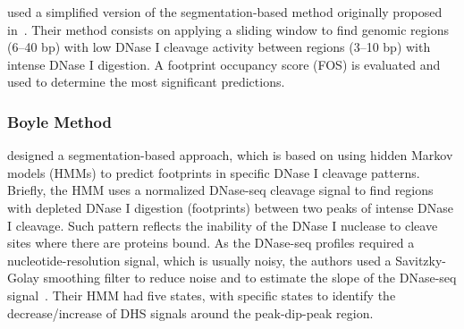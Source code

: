 \documentclass[11pt]{article}
\begin{document}
\cite{neph2012a} used a simplified version of the segmentation-based method originally proposed in~\cite{hesselberth2009}. Their method consists on applying a sliding window to find genomic regions (6--40 bp) with low DNase I cleavage activity between regions (3--10 bp) with intense DNase I digestion. A footprint occupancy score (FOS) is evaluated and used to determine the most significant predictions.

{}

\subsubsection{Boyle Method}
\label{sec:boyle}

\cite{boyle2011} designed a segmentation-based approach, which is based on using hidden Markov models (HMMs) to predict footprints in specific DNase I cleavage patterns. Briefly, the HMM uses a normalized DNase-seq cleavage signal to find regions with depleted DNase I digestion (footprints) between two peaks of intense DNase I cleavage. Such pattern reflects the inability of the DNase I nuclease to cleave sites where there are proteins bound. As the DNase-seq profiles required a nucleotide-resolution signal, which is usually noisy, the authors used a Savitzky-Golay smoothing filter to reduce noise and to estimate the slope of the DNase-seq signal~\citep{madden1978}. Their HMM had five states, with specific states to identify the decrease/increase of DHS signals around the peak-dip-peak region. {}
\end{document}
